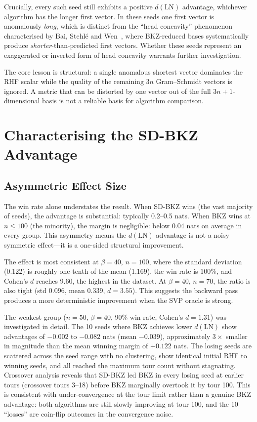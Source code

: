 \documentclass[journal=cic,version=preprint]{iacrj}
\begin{document}
Crucially, every such seed still exhibits a positive $d(\mathrm{LN})$ advantage, whichever algorithm has the longer first vector. In these seeds one first vector is anomalously \emph{long}, which is distinct from the ``head concavity'' phenomenon characterised by Bai, Stehl\'{e} and Wen~\cite{AC:BaiSteWen18}, where BKZ-reduced bases systematically produce \emph{shorter}-than-predicted first vectors. Whether these seeds represent an exaggerated or inverted form of head concavity warrants further investigation.

The core lesson is structural: a single anomalous shortest vector dominates the RHF scalar while the quality of the remaining $3n$ Gram--Schmidt vectors is ignored. A metric that can be distorted by one vector out of the full $3n+1$-dimensional basis is not a reliable basis for algorithm comparison.

\section{Characterising the SD-BKZ Advantage}
\label{sec:characterising}

\subsection{Asymmetric Effect Size}

The win rate alone understates the result. When SD-BKZ wins (the vast majority of seeds), the advantage is substantial: typically 0.2--0.5 nats. When BKZ wins at $n\leq 100$ (the minority), the margin is negligible: below 0.04 nats on average in every group. This asymmetry means the $d(\mathrm{LN})$ advantage is not a noisy symmetric effect---it is a one-sided structural improvement.

The effect is most consistent at $\beta=40$, $n=100$, where the standard deviation (0.122) is roughly one-tenth of the mean (1.169), the win rate is 100\%, and Cohen's $d$ reaches 9.60, the highest in the dataset. At $\beta=40$, $n=70$, the ratio is also tight (std 0.096, mean 0.339, $d=3.55$). This suggests the backward pass produces a more deterministic improvement when the SVP oracle is strong.

The weakest group ($n=50$, $\beta=40$, 90\% win rate, Cohen's $d=1.31$) was investigated in detail. The 10 seeds where BKZ achieves lower $d(\mathrm{LN})$ show advantages of $-0.002$ to $-0.082$ nats (mean $-0.039$), approximately $3\times$ smaller in magnitude than the mean winning margin of $+0.122$ nats. The losing seeds are scattered across the seed range with no clustering, show identical initial RHF to winning seeds, and all reached the maximum tour count without stagnating. Crossover analysis reveals that SD-BKZ led BKZ in every losing seed at earlier tours (crossover tours 3--18) before BKZ marginally overtook it by tour 100. This is consistent with under-convergence at the tour limit rather than a genuine BKZ advantage: both algorithms are still slowly improving at tour 100, and the 10 ``losses'' are coin-flip outcomes in the convergence noise.
\end{document}
